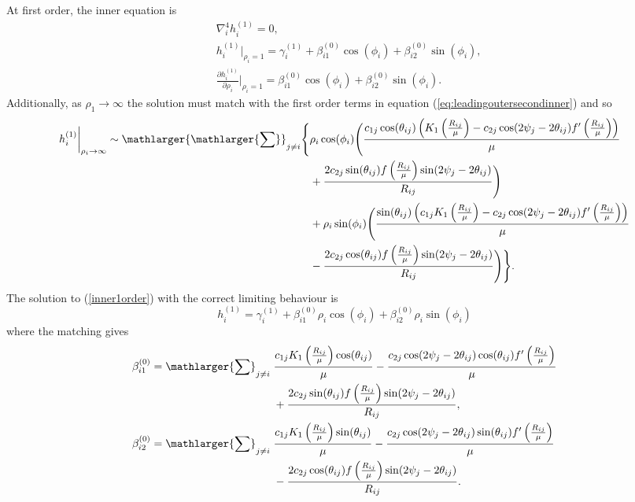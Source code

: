 At first order, the inner equation is
\begin{align}
    &\nabla_i^{4}h_i^{(1)}=0, \label{inner1order}\\ &h_i^{(1)}\biggr\rvert_{\rho_i=1}=\gamma_i^{(1)}+\beta^{(0)}_{i1}\cos(\phi_i)+\beta^{(0)}_{i2}\sin(\phi_i), \label{inner1orderBCval}\\
    &\frac{\partial h_i^{(1)}}{\partial \rho_i}\biggr\rvert_{\rho_i=1}=\beta^{(0)}_{i1}\cos(\phi_i)+\beta^{(0)}_{i2}\sin(\phi_i).\label{inner1orderBCderriv}
\end{align}
Additionally, as $\rho_1\to\infty$ the solution must match with the first order terms in equation (\ref{eq:leadingoutersecondinner}) and so 
\begin{equation}
\begin{split}
    h_i^{(1)}\biggr\rvert_{\rho_i\to\infty} \sim \mathlarger{\mathlarger{\sum}}_{j \neq i} \Bigg\{ &\rho_i \cos (\phi_i) \Bigg(\frac{c_{1j} \cos (\theta_{ij}) \left( K_1\left(\frac{R_{ij}}{\mu }\right) - c_{2j} \cos (2 \psi_j-2 \theta_{ij} ) f'\left(\frac{R_{ij}}{\mu }\right)\right)}{\mu}\\
    &+\frac{2 c_{2j} \sin (\theta_{ij} ) f\left(\frac{R_{ij}}{\mu }\right) \sin (2 \psi_j-2 \theta_{ij} )}{R_{ij}}\Bigg) \\
    &+\rho_i  \sin (\phi_i) \Bigg(\frac{\sin (\theta_{ij} ) \left(c_{1j} K_1\left(\frac{R_{ij}}{\mu }\right)-c_{2j} \cos (2 \psi_j-2 \theta_{ij} ) f'\left(\frac{R_{ij}}{\mu }\right)\right)}{\mu } \\
    &-\frac{2 c_{2j} \cos (\theta_{ij} ) f\left(\frac{R_{ij}}{\mu }\right) \sin (2 \psi_j-2 \theta_{ij} )}{R_{ij}}\Bigg)\Bigg\}.
\end{split}
\end{equation}
The solution to (\ref{inner1order}) with the correct limiting behaviour is
\begin{equation}
    h_i^{(1)} = \gamma_i^{(1)}+\beta^{(0)}_{i1} \rho_i \cos(\phi_i)+\beta^{(0)}_{i2} \rho_i \sin(\phi_i)
\end{equation}
where the matching gives
\begin{equation}
\begin{split}
    \beta^{(0)}_{i1} = \mathlarger{\sum}_{j \neq i}\; &\frac{c_{1j} K_1\left(\frac{R_{ij}}{\mu}\right)\cos (\theta_{ij})}{\mu}-\frac{c_{2j} \cos (2 \psi_j-2\theta_{ij})\cos (\theta_{ij}) f'\left(\frac{R_{ij}}{\mu }\right)}{\mu}\\
    &+\frac{2 c_{2j} \sin (\theta_{ij}) f\left(\frac{R_{ij}}{\mu }\right) \sin (2\psi_j-2 \theta_{ij})}{R_{ij}}, \\
    \beta^{(0)}_{i2} = \mathlarger{\sum}_{j \neq i}\; &\frac{c_{1j} K_1\left(\frac{R_{ij}}{\mu}\right)\sin (\theta_{ij})}{\mu}-\frac{c_{2j} \cos (2 \psi_j-2\theta_{ij})\sin (\theta_{ij}) f'\left(\frac{R_{ij}}{\mu }\right)}{\mu}\\
    &-\frac{2 c_{2j} \cos (\theta_{ij}) f\left(\frac{R_{ij}}{\mu }\right) \sin (2\psi_j-2 \theta_{ij})}{R_{ij}}.
\end{split}
\end{equation}
